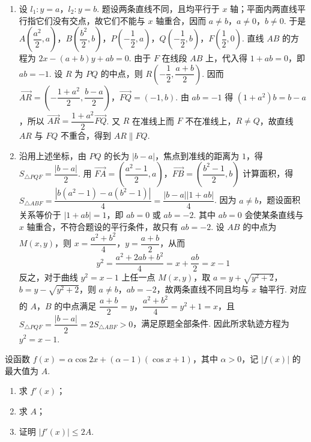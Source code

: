 \begin{solution}
\begin{enumerate}
\item 设 \(l_1:y=a\)，\(l_2:y=b\). 题设两条直线不同，且均平行于 \(x\) 轴；平面内两直线平行指它们没有交点，故它们不能与 \(x\) 轴重合，因而 \(a\ne b\)，\(a\ne0\)，\(b\ne0\). 于是 \(A\left(\dfrac{a^2}{2},a\right)\)，\(B\left(\dfrac{b^2}{2},b\right)\)，\(P\left(-\dfrac12,a\right)\)，\(Q\left(-\dfrac12,b\right)\)，\(F\left(\dfrac12,0\right)\). 直线 \(AB\) 的方程为 \(2x-(a+b)y+ab=0\). 由于 \(F\) 在线段 \(AB\) 上，代入得 \(1+ab=0\)，即 \(ab=-1\). 设 \(R\) 为 \(PQ\) 的中点，则 \(R\left(-\dfrac12,\dfrac{a+b}{2}\right)\). 因而 \(\overrightarrow{AR}=\left(-\dfrac{1+a^2}{2},\dfrac{b-a}{2}\right)\)，\(\overrightarrow{FQ}=(-1,b)\). 由 \(ab=-1\) 得 \((1+a^2)b=b-a\)，所以 \(\overrightarrow{AR}=\dfrac{1+a^2}{2}\overrightarrow{FQ}\). 又 \(R\) 在准线上而 \(F\) 不在准线上，\(R\ne Q\)，故直线 \(AR\) 与 \(FQ\) 不重合，得到 \(AR\parallel FQ\).

\item 沿用上述坐标，由 \(PQ\) 的长为 \(|b-a|\)，焦点到准线的距离为 \(1\)，得 \(S_{\triangle PQF}=\dfrac{|b-a|}{2}\). 用 \(\overrightarrow{FA}=\left(\dfrac{a^2-1}{2},a\right)\)，\(\overrightarrow{FB}=\left(\dfrac{b^2-1}{2},b\right)\) 计算面积，得 \(S_{\triangle ABF}=\dfrac{|b(a^2-1)-a(b^2-1)|}{4}=\dfrac{|b-a||1+ab|}{4}\). 因为 \(a\ne b\)，题设面积关系等价于 \(|1+ab|=1\)，即 \(ab=0\) 或 \(ab=-2\). 其中 \(ab=0\) 会使某条直线与 \(x\) 轴重合，不符合题设的平行条件，故只有 \(ab=-2\). 设 \(AB\) 的中点为 \(M(x,y)\)，则 \(x=\dfrac{a^2+b^2}{4}\)，\(y=\dfrac{a+b}{2}\)，从而
\[
y^2=\frac{a^2+2ab+b^2}{4}=x+\frac{ab}{2}=x-1
\]
反之，对于曲线 \(y^2=x-1\) 上任一点 \(M(x,y)\)，取 \(a=y+\sqrt{y^2+2}\)，\(b=y-\sqrt{y^2+2}\)，则 \(a\ne b\)，\(ab=-2\)，故两条直线不同且均与 \(x\) 轴平行. 对应的 \(A\)，\(B\) 的中点满足 \(\dfrac{a+b}{2}=y\)，\(\dfrac{a^2+b^2}{4}=y^2+1=x\)，且 \(S_{\triangle PQF}=\dfrac{|b-a|}{2}=2S_{\triangle ABF}>0\)，满足原题全部条件. 因此所求轨迹方程为 \(y^2=x-1\).
\end{enumerate}
\end{solution}

\begin{problem}
设函数 \(f(x)=\alpha\cos 2x+(\alpha-1)(\cos x+1)\)，其中 \(\alpha>0\)，记 \(|f(x)|\) 的最大值为 \(A\).

\begin{enumerate}
\item 求 \(f'(x)\)；
\item 求 \(A\)；
\item 证明 \(|f'(x)|\le2A\).
\end{enumerate}
\end{problem}


